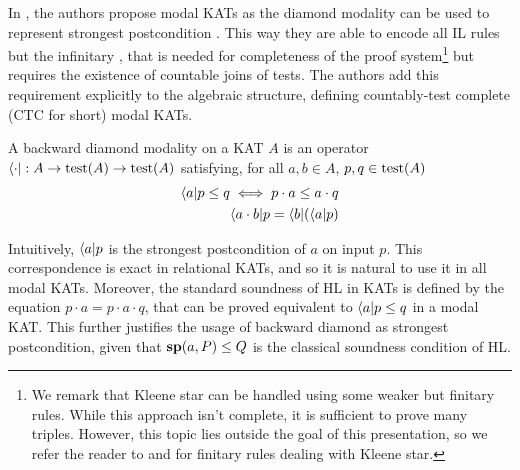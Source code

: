 In \cite{MOH21}, the authors propose modal KATs as the diamond modality can be used to represent strongest postcondition \cite{DMS06}. This way they are able to encode all IL rules but the infinitary , that is needed for completeness of the proof system\footnote{We remark that Kleene star can be handled using some weaker but finitary rules. While this approach isn't complete, it is sufficient to prove many triples. However, this topic lies outside the goal of this presentation, so we refer the reader to \cite{OHearn20} and \cite{MOH21} for finitary rules dealing with Kleene star.} but requires the existence of countable joins of tests. The authors add this requirement explicitly to the algebraic structure, defining countably-test complete (CTC for short) modal KATs.
\begin{definition}
	A backward diamond modality on a KAT $A$ is an operator $\langle \cdot \vert : A \rightarrow \text{test}(A) \rightarrow \text{test}(A)$ satisfying, for all $a, b \in A$, $p, q \in \text{test}(A)$
	\begin{align*}
		\langle a \vert p \le q \iff p \cdot a \le a \cdot q \\
		\langle a \cdot b \vert p = \langle b \vert (\langle a \vert p)
	\end{align*}
\end{definition}
Intuitively, $\langle a \vert p$ is the strongest postcondition of $a$ on input $p$. This correspondence is exact in relational KATs, and so it is natural to use it in all modal KATs. Moreover, the standard soundness of HL in KATs is defined by the equation $p \cdot a = p \cdot a \cdot q$, that can be proved equivalent to $\langle a \vert p \le q$ in a modal KAT. This further justifies the usage of backward diamond as strongest postcondition, given that $\textbf{sp}(a, P) \le Q$ is the classical soundness condition of HL.

